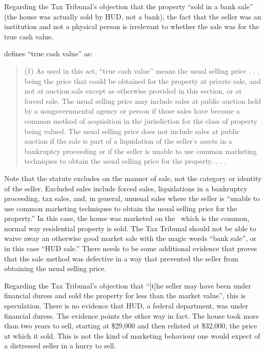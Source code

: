 \documentclass[12pt,\documentclassflag]{michiganCourtOfAppealsBrief}
\begin{document}
Regarding the Tax Tribunal's objection that the property ``sold in a bank sale'' (the house was actually sold by HUD, not a bank), the fact that the seller was an institution and not a physical person is irrelevant to whether the sale was for the true cash value.

 defines ``true cash value'' as:

\begin{quote}
  (1) As used in this act, ``true cash value'' means the usual selling price . . . being the price that could be obtained for the property at private sale, and not at auction sale except as otherwise provided in this section, or at forced sale. The usual selling price may include sales at public auction held by a nongovernmental agency or person if those sales have become a common method of acquisition in the jurisdiction for the class of property being valued. The usual selling price does not include sales at public auction if the sale is part of a liquidation of the seller's assets in a bankruptcy proceeding or if the seller is unable to use common marketing techniques to obtain the usual selling price for the property. . . . 
\end{quote}

Note that the statute excludes on the manner of sale, not the category or identity of the seller. Excluded sales include forced sales, liquidations in a bankruptcy proceeding, tax sales, and, in general, unusual sales where the seller is ``unable to use common marketing techniques to obtain the usual selling price for the property.'' In this case, the house was marketed on the \MLS\ which is the common, normal way residential property is sold. The Tax Tribunal should not be able to waive away an otherwise good market sale with the magic words ``bank sale'', or in this case ``HUD sale.'' There needs to be some additional evidence that proves that the sale method was defective in a way that prevented the seller from obtaining the usual selling price.

Regarding the Tax Tribunal's objection that ``[t]he seller may have been under financial duress and sold the property for less than the market value'', this is speculation. There is no evidence that HUD, a federal department, was under financial duress. The evidence points the other way in fact. The house took more than two years to sell, starting at \$29,000 and then relisted at \$32,000, the price at which it sold. This is not the kind of marketing behaviour one would expect of a distressed seller in a hurry to sell.
\end{document}
